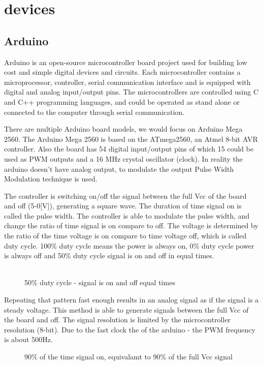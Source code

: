 \documentclass[\main/master.tex]{subfiles}
\begin{document}
\chapter{devices}\label{chp:3}
\doublespacing

\section{Arduino}
Arduino is an open-source microcontroller board project used for building low cost and simple digital devices and circuits. Each microcontroller contains a microprocessor, controller, serial communication interface and is equipped with digital and analog input/output pins. The microcontrollers are controlled using C and C++ programming languages, and could be operated as stand alone or connected to the computer through serial communication. 
\par
There are multiple Arduino board models, we would focus on Arduino Mega 2560. The Arduino Mega 2560 is based on the ATmega2560, an Atmel 8-bit AVR controller. Also the board has 54 digital input/output pins of which 15 could be used as PWM outputs and a 16 MHz crystal oscillator (clock). In reality the arduino doesn't have analog output, to modulate the output Pulse Width Modulation technique is used.
\par
The controller is switching on/off the signal between the full Vcc of the board and off (5-0[V]), generating a square wave. The duration of time signal on is called the pulse width. The controller is able to modulate the pulse width, and change the ratio of time signal is on compare to off. The voltage is determined by the ratio of the time voltage is on compare to time voltage off, which is called duty cycle. 100\% duty cycle means the power is always on, 0\% duty cycle power is always off and 50\% duty cycle signal is on and off in equal times. 
\\
\\
\par

\begin{figure}[htbp]
	\centering
	\caption[duty cycle 50\%]{50\% duty cycle  - signal is on and off equal times}
	\label{fig:duty50}
\end{figure}
Repeating that pattern fast enough results in an analog signal as if the signal is a steady voltage. This method is able to generate signals between the full Vcc of the board and off. The signal resolution is limited by the microcontroller resolution (8-bit). Due to the fast clock the of the arduino - the PWM frequency is about 500Hz.
\par
\begin{figure}[htbp]
	\centering
	\caption[duty cycle 90\%]{90\% of the time signal on, equivalamt to 90\% of the full Vcc signal}
	\label{fig:duty90}
\end{figure}
\end{document}
